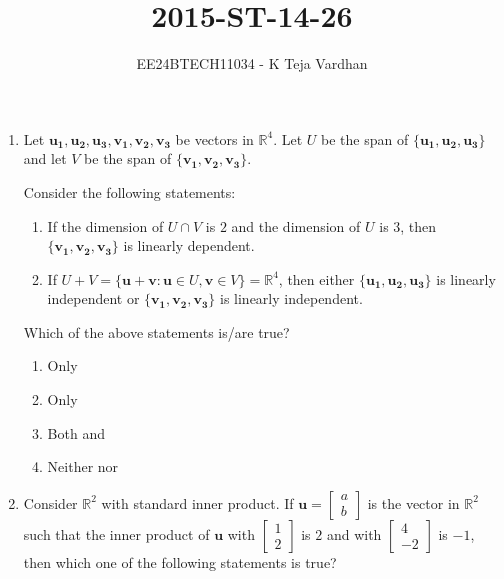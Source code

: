 \documentclass[journal]{IEEEtran}
\numberwithin{equation}{enumi}
\numberwithin{figure}{enumi}
\begin{document}

\title{2015-ST-14-26}
\author{EE24BTECH11034 - K Teja Vardhan}
{\let\newpage\relax\maketitle}


\begin{enumerate}



\item Let $\mathbf{u_1}, \mathbf{u_2}, \mathbf{u_3}, \mathbf{v_1}, \mathbf{v_2}, \mathbf{v_3}$ be vectors in $\mathbb{R}^4$. Let $U$ be the span of $\{\mathbf{u_1}, \mathbf{u_2}, \mathbf{u_3}\}$ and let $V$ be the span of $\{\mathbf{v_1}, \mathbf{v_2}, \mathbf{v_3}\}$.

Consider the following statements:

\begin{enumerate}[label=\brak{\Roman*}]
\item If the dimension of $U \cap V$ is $2$ and the dimension of $U$ is $3$, then $\{\mathbf{v_1}, \mathbf{v_2}, \mathbf{v_3}\}$ is linearly dependent.

\item If $U + V = \{\mathbf{u} + \mathbf{v} : \mathbf{u} \in U, \mathbf{v} \in V\} = \mathbb{R}^4$, then either $\{\mathbf{u_1}, \mathbf{u_2}, \mathbf{u_3}\}$ is linearly independent or $\{\mathbf{v_1}, \mathbf{v_2}, \mathbf{v_3}\}$ is linearly independent.
\end{enumerate}

Which of the above statements is/are true?

\begin{enumerate}[label=\brak{\Alph*}]
\item Only 

\item Only 

\item Both  and 

\item Neither  nor 
\end{enumerate}


\item Consider $\mathbb{R}^2$ with standard inner product. If $\mathbf{u} = \begin{bmatrix} a \\ b \end{bmatrix}$ is the vector in $\mathbb{R}^2$ such that the inner product of $\mathbf{u}$ with $\begin{bmatrix} 1 \\ 2 \end{bmatrix}$ is $2$ and with $\begin{bmatrix} 4 \\ -2 \end{bmatrix}$ is $-1$, then which one of the following statements is true?


\end{enumerate}
\end{document}
